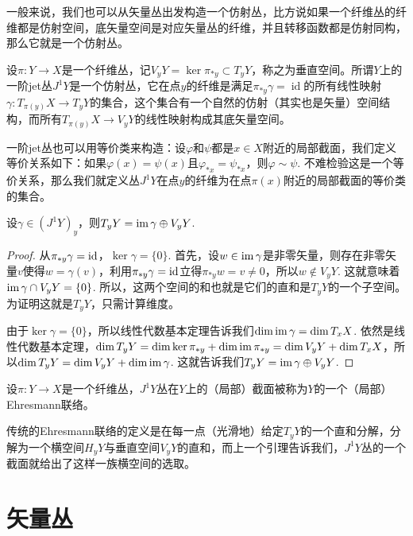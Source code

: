 一般来说，我们也可以从矢量丛出发构造一个仿射丛，比方说如果一个纤维丛的纤维都是仿射空间，底矢量空间是对应矢量丛的纤维，并且转移函数都是仿射同构，那么它就是一个仿射丛。

\begin{para}[一阶jet丛]
	设$\pi:Y\to X$是一个纤维丛，记$V_yY=\ker\pi_{*y}\subset T_yY$，称之为垂直空间。所谓$Y$上的一阶jet丛$J^1Y$是一个仿射丛，它在点$y$的纤维是满足$\pi_{*y}\gamma=\operatorname{id}$的所有线性映射$\gamma:T_{\pi(y)}X\to T_yY$的集合，这个集合有一个自然的仿射（其实也是矢量）空间结构，而所有$T_{\pi(y)}X\to V_yY$的线性映射构成其底矢量空间。

	一阶jet丛也可以用等价类来构造：设$\varphi$和$\psi$都是$x\in X$附近的局部截面，我们定义等价关系如下：如果$\varphi(x)=\psi(x)$且$\varphi_{*x}=\psi_{*x}$，则$\varphi\sim \psi$. 不难检验这是一个等价关系，那么我们就定义丛$J^1Y$在点$y$的纤维为在点$\pi(x)$附近的局部截面的等价类的集合。
\end{para}

\begin{lem}
	设$\gamma\in (J^1Y)_y$，则$T_yY=\operatorname{im}\gamma\oplus V_yY$.
\end{lem}

\begin{proof}
	从$\pi_{*y}\gamma=\operatorname{id}$，$\ker \gamma=\{0\}$. 首先，设$w\in \operatorname{im}\gamma$是非零矢量，则存在非零矢量$v$使得$w=\gamma(v)$，利用$\pi_{*y}\gamma=\operatorname{id}$立得$\pi_{*y}w=v\neq 0$，所以$w\not\in  V_yY$. 这就意味着$\operatorname{im}\gamma\cap V_yY=\{0\}$. 所以，这两个空间的和也就是它们的直和是$T_yY$的一个子空间。为证明这就是$T_yY$，只需计算维度。

	由于$\ker \gamma=\{0\}$，所以线性代数基本定理告诉我们$\dim \operatorname{im}\gamma=\dim T_xX$. 依然是线性代数基本定理，$\dim T_yY=\dim \ker \pi_{*y}+\dim \operatorname{im} \pi_{*y}=\dim V_yY+\dim T_xX$，所以$\dim T_yY=\dim V_yY+\dim \operatorname{im}\gamma$. 这就告诉我们$T_yY=\operatorname{im}\gamma\oplus V_yY$.
\end{proof}

\begin{para}[Ehresmann联络]
	设$\pi:Y\to X$是一个纤维丛，$J^1Y$丛在$Y$上的（局部）截面被称为$Y$的一个（局部）Ehresmann联络。
\end{para}

传统的Ehresmann联络的定义是在每一点（光滑地）给定$T_yY$的一个直和分解，分解为一个横空间$H_yY$与垂直空间$V_yY$的直和，而上一个引理告诉我们，$J^1Y$丛的一个截面就给出了这样一族横空间的选取。

\section{矢量丛}

